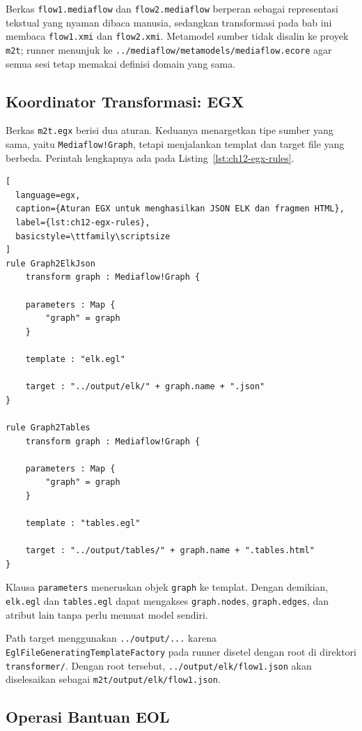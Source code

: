 Berkas \texttt{flow1.mediaflow} dan \texttt{flow2.mediaflow} berperan sebagai representasi tekstual yang nyaman dibaca manusia, sedangkan transformasi pada bab ini membaca \texttt{flow1.xmi} dan \texttt{flow2.xmi}. Metamodel sumber tidak disalin ke proyek \texttt{m2t}; runner menunjuk ke \texttt{../mediaflow/metamodels/mediaflow.ecore} agar semua sesi tetap memakai definisi domain yang sama.

\subsection{Koordinator Transformasi: EGX}

Berkas \texttt{m2t.egx} berisi dua aturan. Keduanya menargetkan tipe sumber yang sama, yaitu \texttt{Mediaflow!Graph}, tetapi menjalankan templat dan target file yang berbeda. Perintah lengkapnya ada pada Listing~\ref{lst:ch12-egx-rules}.

\begin{lstlisting}[
  language=egx,
  caption={Aturan EGX untuk menghasilkan JSON ELK dan fragmen HTML},
  label={lst:ch12-egx-rules},
  basicstyle=\ttfamily\scriptsize
]
rule Graph2ElkJson
    transform graph : Mediaflow!Graph {

    parameters : Map {
        "graph" = graph
    }

    template : "elk.egl"

    target : "../output/elk/" + graph.name + ".json"
}

rule Graph2Tables
    transform graph : Mediaflow!Graph {

    parameters : Map {
        "graph" = graph
    }

    template : "tables.egl"

    target : "../output/tables/" + graph.name + ".tables.html"
}
\end{lstlisting}

Klausa \texttt{parameters} meneruskan objek \texttt{graph} ke templat. Dengan demikian, \texttt{elk.egl} dan \texttt{tables.egl} dapat mengakses \texttt{graph.nodes}, \texttt{graph.edges}, dan atribut lain tanpa perlu memuat model sendiri.

Path target menggunakan \texttt{../output/...} karena \texttt{EglFileGeneratingTemplateFactory} pada runner disetel dengan root di direktori \texttt{transformer/}. Dengan root tersebut, \texttt{../output/elk/flow1.json} akan diselesaikan sebagai \texttt{m2t/output/elk/flow1.json}.

\subsection{Operasi Bantuan EOL}

